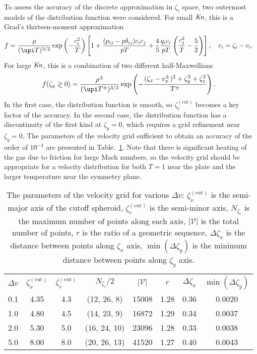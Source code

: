 \documentclass[]{jfm}
\newcommand{\Kn}{\mbox{\textit{Kn}}}
\begin{document}
To assess the accuracy of the discrete approximation in \(\zeta_i\) space,
two outermost models of the distribution function were considered.
For small \(\Kn\), this is a Grad's thirteen-moment approximation
\begin{equation}\label{eq:grad13}
    f = \frac{\rho}{(\upi T)^{3/2}}\exp\left(-\frac{c_i^2}{ T}\right)
    \left[ 1 + \frac{(p_{ij}-p\delta_{ij})c_ic_j}{pT} + \frac4{5}\frac{q_ic_i}{pT}\left(\frac{c_j^2}{T}-\frac5{2}\right) \right],
    \quad c_i = \zeta_i - v_i.
\end{equation}
For large \(\Kn\), this is a combination of two different half-Maxwellians
\begin{equation}\label{eq:double_Maxwell}
    f(\zeta_y\gtrless0) = \frac{\rho^\pm}{(\upi T^\pm)^{3/2}}\exp\left(-\frac{(\zeta_x-v_x^\pm)^2+\zeta_y^2+\zeta_z^2}{T^\pm}\right).
\end{equation}
In the first case, the distribution function is smooth,
so \(\zeta_i^{(cut)}\) becomes a key factor of the accuracy.
In the second case, the distribution function has a discontinuity of the first kind at \(\zeta_y=0\),
which requires a grid refinement near \(\zeta_y=0\).
The parameters of the velocity grid sufficient to obtain an accuracy of the order of \(10^{-4}\)
are presented in Table.~\ref{table:velocity_grid}.
Note that there is significant heating of the gas due to friction for large Mach numbers,
so the velocity grid should be appropriate for a velocity distribution
for both \(T=1\) near the plate and the larger temperature near the symmetry plane.

\begin{table}
    \centering
    \begin{tabular}{cccccccc}
        \(\Delta{v}\) & \(\zeta^{(\mathrm{cut})}_x\) & \(\zeta^{(\mathrm{cut})}_r\)
            & \(N_{\zeta_i}/2\) & \(|\mathcal{V}|\) & \(r\) & \(\Delta\zeta_x\) & \(\min(\Delta\zeta_y)\) \\[3pt]
        0.1 & 4.35 & 4.3 & (12, 26, 8)  & 15008 & 1.28 & 0.36 & 0.0020 \\
        1.0 & 4.80 & 4.5 & (14, 23, 9)  & 16872 & 1.29 & 0.34 & 0.0037 \\
        2.0 & 5.30 & 5.0 & (16, 24, 10) & 23096 & 1.28 & 0.33 & 0.0038 \\
        5.0 & 8.00 & 8.0 & (20, 26, 13) & 41520 & 1.27 & 0.40 & 0.0043 \\
    \end{tabular}
    \caption{The parameters of the velocity grid for various \(\Delta{v}\):
        \(\zeta^{(\mathrm{cut})}_x\) is the semi-major axis of the cutoff spheroid,
        \(\zeta^{(\mathrm{cut})}_r\) is the semi-minor axis,
        \(N_{\zeta_i}\) is the maximum number of points along each axis,
        \(|\mathcal{V}|\) is the total number of points,
        \(r\) is the ratio of a geometric sequence,
        \(\Delta\zeta_x\) is the distance between points along \(\zeta_x\) axis,
        \(\min(\Delta\zeta_y)\) is the minimum distance between points along \(\zeta_y\) axis.}
    \label{table:velocity_grid}
\end{table}
\end{document}

